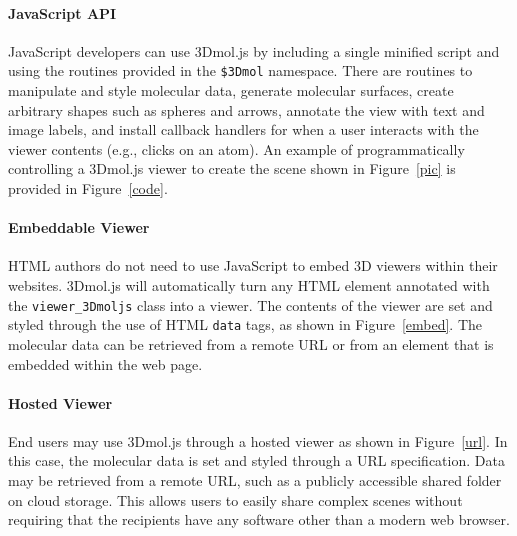 \documentclass[]{bioinfo}
\begin{document}
\paragraph{JavaScript API}  JavaScript developers can use 3Dmol.js by including a single minified script and using the routines provided in the \texttt{\$3Dmol} namespace. There are routines to manipulate and style molecular data, generate molecular surfaces, create arbitrary shapes such as spheres and arrows, annotate the view with text and image labels, and install callback handlers for when a user interacts with the viewer contents (e.g., clicks on an atom).  An example of programmatically controlling a 3Dmol.js viewer to create the scene shown in Figure~\ref{pic} is provided in Figure~\ref{code}.

\paragraph{Embeddable Viewer} HTML authors do not need to use JavaScript to embed 3D viewers within their websites.  3Dmol.js will automatically turn any HTML element annotated with the \texttt{viewer\_3Dmoljs} class into a viewer.  The contents of the viewer are set and styled through the use of HTML \texttt{data} tags, as shown in Figure~\ref{embed}.  The molecular data can be retrieved from a remote URL or from an element that is embedded within the web page.

\paragraph{Hosted Viewer} End users may use 3Dmol.js through a hosted viewer as shown in Figure~\ref{url}. In this case, the molecular data is set and styled through a URL specification.  Data may be retrieved from a remote URL, such as a publicly accessible shared folder on cloud storage.  This allows users to easily share complex scenes without requiring that the recipients have any software other than a modern web browser. 
\end{document}

